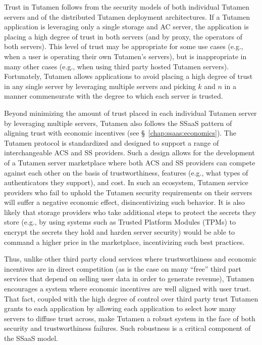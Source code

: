 Trust in Tutamen follows from the security models of both individual
Tutamen servers and of the distributed Tutamen deployment
architectures. If a Tutamen application is leveraging only a single
storage and AC server, the application is placing a high degree of
trust in both servers (and by proxy, the operators of both
servers). This level of trust may be appropriate for some use cases
(e.g., when a user is operating their own Tutamen's servers), but is
inappropriate in many other cases (e.g., when using third party hosted
Tutamen servers). Fortunately, Tutamen allows applications to avoid
placing a high degree of trust in any single server by leveraging
multiple servers and picking $k$ and $n$ in a manner commensurate with
the degree to which each server is trusted.

Beyond minimizing the amount of trust placed in each individual
Tutamen server by leveraging multiple servers, Tutamen also follows
the SSaaS pattern of aligning trust with economic incentives (see
\S~\ref{chap:ssaas:economics}). The Tutamen protocol is standardized
and designed to support a range of interchangeable ACS and SS
providers. Such a design allows for the development of a Tutamen
server marketplace where both ACS and SS providers can compete against
each other on the basis of trustworthiness, features (e.g., what types
of authenticators they support), and cost. In such an ecosystem,
Tutamen service providers who fail to uphold the Tutamen security
requirements on their servers will suffer a negative economic effect,
disincentivizing such behavior. It is also likely that storage
providers who take additional steps to protect the secrets they store
(e.g., by using systems such as Trusted Platform Modules (TPMs) to
encrypt the secrets they hold and harden server security) would be
able to command a higher price in the marketplace, incentivizing such
best practices.

Thus, unlike other third party cloud services where trustworthiness
and economic incentives are in direct competition (as is the case on
many ``free'' third part services that depend on selling user data in
order to generate revenue), Tutamen encourages a system where economic
incentives are well aligned with user trust. That fact, coupled with
the high degree of control over third party trust Tutamen grants to
each application by allowing each application to select how many
servers to diffuse trust across, make Tutamen a robust system in the
face of both security and trustworthiness failures. Such robustness is
a critical component of the SSaaS model.

